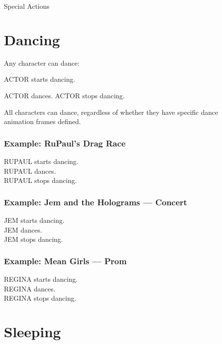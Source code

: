 \documentclass[11pt,letterpaper,oldstylefigures]{memoir}
\makeatletter
\newcommand{\stagedir}[1]{#1\par\vspace{1\baselineskip}}
\newenvironment{FountainExample}
  {\begingroup
  \ttfamily\small
   \setlength{\parindent}{0pt}
  \setlength{\parskip}{0.5em}
  \allowdisplaybreaks
  \setlength{\displaywidowpenalty}{0}
  \setlength{\widowpenalty}{0}
  \setlength{\clubpenalty}{0}
  \setlength{\interlinepenalty}{0}
}
  {\endgroup}
\let\oldchapter\chapter
\def\chapter{%
  \@ifstar
    {\FountainScripting@starchapter}%
    {\@dblarg\FountainScripting@chapter}}
\def\FountainScripting@starchapter#1{\oldchapter*{#1}\chaptermark{#1}}
\def\FountainScripting@chapter[#1]#2{\oldchapter[#1]{#2}\chaptermark{#2}}
\makeatother
\begin{document}
\chapter{Special Actions}

\section{Dancing}

Any character can dance:

\begin{FountainExample}
\stagedir{ACTOR starts dancing.}
ACTOR dances.
ACTOR stops dancing.
\end{FountainExample}

All characters can dance, regardless of whether they have specific dance animation frames defined.

\subsubsection{Example: RuPaul's Drag Race}
\begin{FountainExample}
RUPAUL starts dancing.\\
RUPAUL dances.\\
RUPAUL stops dancing.
\end{FountainExample}

\subsubsection{Example: Jem and the Holograms — Concert}
\begin{FountainExample}
JEM starts dancing.\\
JEM dances.\\
JEM stops dancing.
\end{FountainExample}

\subsubsection{Example: Mean Girls — Prom}
\begin{FountainExample}
REGINA starts dancing.\\
REGINA dances.\\
REGINA stops dancing.
\end{FountainExample}

\section{Sleeping}
\end{document}

